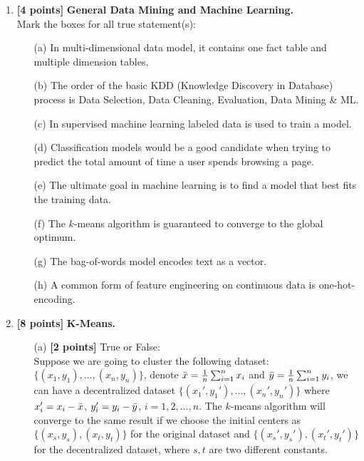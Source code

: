 \documentclass[10pt]{article}
\begin{document}
\begin{enumerate}

	\item \textbf{[4 points]} \textbf{General Data Mining and Machine Learning.} \\
	      Mark the boxes for all true statement(s):
	      \begin{itemize}
		      \item[(a)] In multi-dimensional data model, it contains one fact table and multiple dimension tables.
		      \item[(b)] The order of the basic KDD (Knowledge Discovery in Database) process is Data Selection, Data Cleaning, Evaluation, Data Mining \& ML.
		      \item[(c)] In supervised machine learning labeled data is used to train a model.
		      \item[(d)] Classification models would be a good candidate when trying to predict the total
		            amount of time a user spends browsing a page.
		      \item[(e)] The ultimate goal in machine learning is to find a model that best fits the training data.
		      \item[(f)] The $k$-means algorithm is guaranteed to converge to the global optimum.
		      \item[(g)] The bag-of-words model encodes text as a vector.
		      \item[(h)] A common form of feature engineering on continuous data is one-hot-encoding.
	      \end{itemize}

	\item \textbf{[8 points]} \textbf{K-Means.}
	      \begin{itemize}
		      \item[(a)] \textbf{[2 points]} True or False: \\
		            Suppose we are going to cluster the following dataset: $\{(x_1, y_1), ..., (x_n, y_n)\}$,
		            denote $\Bar{x} = \frac{1}{n}\sum_{i=1}^n x_i$ and $\Bar{y} = \frac{1}{n}\sum_{i=1}^n y_i$,
		            we can have a decentralized dataset $\{(x_1', y_1'), ..., (x_n', y_n')\}$
		            where $x_i' = x_i - \Bar{x}$, $y_i' = y_i - \Bar{y}$, $i = 1,2,...,n$.
		            The $k$-means algorithm will converge to the same result if we choose the initial
		            centers as $\{(x_s, y_s), (x_t, y_t)\}$ for the original dataset and $\{(x_s', y_s'), (x_t', y_t')\}$
		            for the decentralized dataset, where $s, t$ are two different constants.


\end{itemize}
\end{enumerate}
\end{document}
